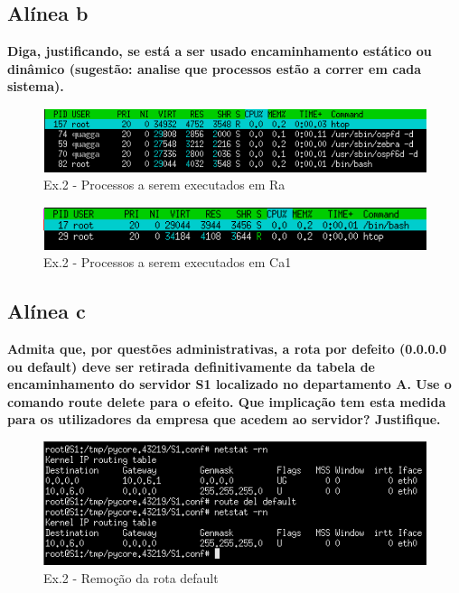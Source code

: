 \documentclass[a4paper]{report}
\begin{document}
\subsection{Alínea b}
\textbf{Diga, justificando, se está a ser usado encaminhamento estático ou dinâmico
(sugestão: analise que processos estão a correr em cada sistema).}

\begin{figure}[H]
    \centering 
    \includegraphics[width=\textwidth]{images/htop2a.png}
    \caption{Ex.2 - Processos a serem executados em Ra}
    \label{fig:htop2a}
\end{figure}

\begin{figure}[H]
    \centering 
    \includegraphics[width=\textwidth]{images/htopca1.png}
    \caption{Ex.2 - Processos a serem executados em Ca1}
    \label{fig:htopca1}
\end{figure}

\subsection{Alínea c}
\textbf{Admita que, por questões administrativas, a rota por defeito (0.0.0.0 ou 
default) deve ser retirada definitivamente da tabela de encaminhamento do 
servidor S1 localizado no departamento A. Use o comando route delete para o 
efeito. Que implicação tem esta medida para os utilizadores da empresa que 
acedem ao servidor? Justifique.}

\begin{figure}[H]
    \centering 
    \includegraphics[width=\textwidth]{images/routeDelete.png}
    \caption{Ex.2 - Remoção da rota default}
    \label{fig:routeDelete}
\end{figure}
\end{document}
